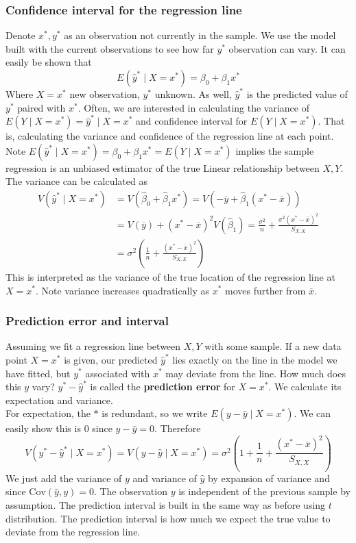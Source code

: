 \documentclass[12pt, a4paper]{article}
\theoremstyle{definition}
\newcommand{\ol}{\overline}
\newcommand{\f}{\frac}
\newcommand{\BB}[1]{\left(#1\right)}
\newcommand{\Cov}{\mathrm{Cov}}
\begin{document}
		\subsubsection{Confidence interval for the regression line}
		
		Denote $x^*, y^*$ as an observation not currently in the sample. We use the model built with the current observations to see how far $y^*$ observation can vary. It can easily be shown that 
		$$E(\hat y^* \mid X = x^*) = \beta_0 + \beta_1 x^*$$
		Where $X = x^*$ new observation, $y^*$ unknown. As well, $\hat y^*$ is the predicted value of $y^*$ paired with $x^*$. Often, we are interested in calculating the variance of $E(Y \mid X = x^*) = \hat y^* \mid X = x^*$ and confidence interval for $E(Y \mid X = x^*)$. That is, calculating the variance and confidence of the regression line at each point. Note $E(\hat y^* \mid X = x^*) = \beta_0 + \beta_1 x^* = E(Y\mid X = x^*)$ implies the sample regression is an unbiased estimator of the true Linear relationship between $X,Y$. The variance can be calculated as 
		\begin{align*}
			V(\hat y^* \mid X = x^*) &= V(\hat \beta_0 + \hat \beta_1 x^*) = V(- \ol y + \hat\beta_1(x^* - \ol x))  \\
			&=  V(\ol y) + (x^* - \ol x)^2V(\hat \beta_1) = \f{\sigma^2}{n} + \f{\sigma^2(x^* - \ol x)^2 }{S_{X,X}} \\
			&=  \sigma^2 \BB{ \f1n + \f{(x^* - \ol x)^2}{S_{X,X}} }
		\end{align*}
		This is interpreted as the variance of the true location of the regression line at $X = x^*$. Note variance increases quadratically as $x^*$ moves further from $\ol x$.
		
		\subsubsection{Prediction error and interval}
		Assuming we fit a regression line between $X,Y$ with some sample. If a new data point $X = x^*$ is given, our predicted $\hat y^*$ lies exactly on the line in the model we have fitted, but $y^*$ associated with $x^*$ may deviate from the line. How much does this $y$ vary? $y^* - \hat y^*$ is called the {\bf prediction error} for $X = x^*$. We calculate its expectation and variance.\\
		
		For expectation, the $*$ is redundant, so we write
		$E(y - \hat y \mid X = x^*)$. We can easily show this is $0$ since $y - \hat y = 0$.
		Therefore 
		$$
			V(y^* - \hat y^* \mid X = x^*) = V(y - \hat y \mid X = x^*) = \sigma^2 \BB{
				1 + \f1n + \f{(x^* - \ol x)^2}{S_{X,X}}
			}
		$$
		We just add the variance of $y$ and variance of $\hat y$ by expansion of variance and since $\Cov(\hat y, y) = 0$. The observation $y$ is independent of the previous sample by assumption. The prediction interval is built in the same way as before using $t$ distribution. The prediction interval is how much we expect the true value to deviate from the regression line.
		
\end{document}
